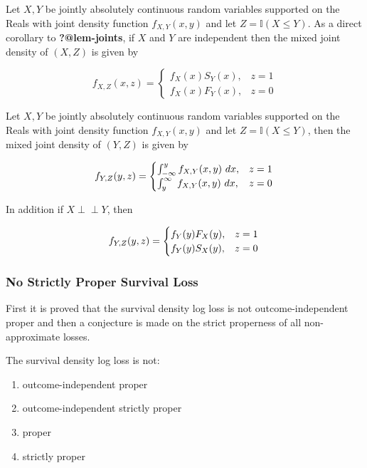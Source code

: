 \documentclass[
  letterpaper,
]{scrbook}
\providecommand{\tightlist}{%
  \setlength{\itemsep}{0pt}\setlength{\parskip}{0pt}}\usepackage{longtable,booktabs,array}
\theoremstyle{plain}
\theoremstyle{definition}
\theoremstyle{remark}
\begin{document}
\leavevmode{}%
\label{cor:joints} Let \(X,Y\) be jointly absolutely continuous random
variables supported on the Reals with joint density function
\(f_{X,Y}(x,y)\) and let \(Z = \mathbb{I}(X \leq Y)\). As a direct
corollary to \textbf{?@lem-joints}, if \(X\) and \(Y\) are independent
then the mixed joint density of \((X,Z)\) is given by

\[
f_{X,Z}(x,z) =
\begin{cases}
f_X(x)S_Y(x), & z = 1 \\
f_X(x)F_Y(x), & z = 0
\end{cases}
\]

\leavevmode{}%
\label{lem:joints_rev} Let \(X,Y\) be jointly absolutely continuous
random variables supported on the Reals with joint density function
\(f_{X,Y}(x,y)\) and let \(Z = \mathbb{I}(X \leq Y)\), then the mixed
joint density of \((Y,Z)\) is given by

\[
f_{Y,Z}(y,z) =
\begin{cases}
\int^y_{-\infty} f_{X,Y}(x,y) \ dx, & z = 1\\
\int^\infty_y \ f_{X,Y}(x,y) \ dx, & z = 0
\end{cases} \\
\]

In addition if \(X \perp \!\!\! \perp Y\), then

\[
f_{Y,Z}(y,z) =
\begin{cases}
f_Y(y)F_X(y), & z = 1\\
f_Y(y)S_X(y), & z = 0
\end{cases} \\
\]

\hypertarget{sec-eval-distr-score-proper-nostrict}{%
\subsubsection{No Strictly Proper Survival
Loss}\label{sec-eval-distr-score-proper-nostrict}}

First it is proved that the survival density log loss is not
outcome-independent proper and then a conjecture is made on the strict
properness of all non-approximate losses.

\leavevmode{}%
\label{prop:sdll_proper} The survival density log loss is not:

\begin{enumerate}
\def\labelenumi{\roman{enumi}.}
\tightlist
\item
  outcome-independent proper
\item
  outcome-independent strictly proper
\item
  proper
\item
  strictly proper
\end{enumerate}
\end{document}

